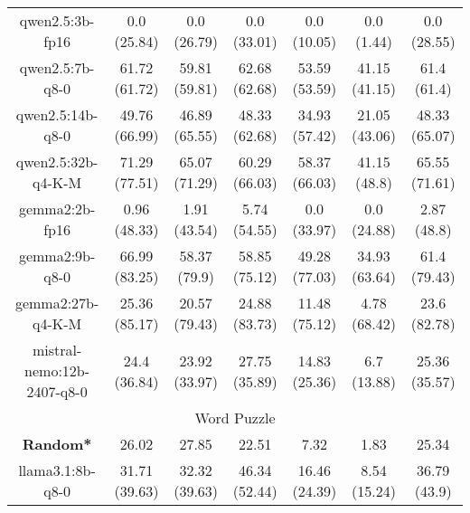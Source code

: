 \begin{table}[]
{\begin{tabular}{ccccccc}
        \multicolumn{1}{c|}{qwen2.5:3b-fp16} & 0.0 (25.84) & 0.0 (26.79) & \multicolumn{1}{c|}{0.0 (33.01)} & 0.0 (10.05) & \multicolumn{1}{c|}{0.0 (1.44)} & 0.0 (28.55) \\
        

        \multicolumn{1}{c|}{qwen2.5:7b-q8-0} & 61.72 (61.72) & 59.81 (59.81) & \multicolumn{1}{c|}{62.68 (62.68)} & 53.59 (53.59) & \multicolumn{1}{c|}{41.15 (41.15)} & 61.4 (61.4) \\
        

        \multicolumn{1}{c|}{qwen2.5:14b-q8-0} & 49.76 (66.99) & 46.89 (65.55) & \multicolumn{1}{c|}{48.33 (62.68)} & 34.93 (57.42) & \multicolumn{1}{c|}{21.05 (43.06)} & 48.33 (65.07) \\
        

        \multicolumn{1}{c|}{qwen2.5:32b-q4-K-M} & 71.29 (77.51) & 65.07 (71.29) & \multicolumn{1}{c|}{60.29 (66.03)} & 58.37 (66.03) & \multicolumn{1}{c|}{41.15 (48.8)} & 65.55 (71.61) \\
        

        \multicolumn{1}{c|}{gemma2:2b-fp16} & 0.96 (48.33) & 1.91 (43.54) & \multicolumn{1}{c|}{5.74 (54.55)} & 0.0 (33.97) & \multicolumn{1}{c|}{0.0 (24.88)} & 2.87 (48.8) \\
        

        \multicolumn{1}{c|}{gemma2:9b-q8-0} & 66.99 (83.25) & 58.37 (79.9) & \multicolumn{1}{c|}{58.85 (75.12)} & 49.28 (77.03) & \multicolumn{1}{c|}{34.93 (63.64)} & 61.4 (79.43) \\
        

        \multicolumn{1}{c|}{gemma2:27b-q4-K-M} & 25.36 (85.17) & 20.57 (79.43) & \multicolumn{1}{c|}{24.88 (83.73)} & 11.48 (75.12) & \multicolumn{1}{c|}{4.78 (68.42)} & 23.6 (82.78) \\
        

        \multicolumn{1}{c|}{mistral-nemo:12b-2407-q8-0} & 24.4 (36.84) & 23.92 (33.97) & \multicolumn{1}{c|}{27.75 (35.89)} & 14.83 (25.36) & \multicolumn{1}{c|}{6.7 (13.88)} & 25.36 (35.57) \\
        
\hline
\multicolumn{7}{c}{Word Puzzle} \\ \hline
\multicolumn{1}{c|}{\textbf{Random*}} & 26.02 & 27.85 & \multicolumn{1}{c|}{22.51} & 7.32 & \multicolumn{1}{c|}{1.83} & 25.34 \\ \hline

        \multicolumn{1}{c|}{llama3.1:8b-q8-0} & 31.71 (39.63) & 32.32 (39.63) & \multicolumn{1}{c|}{46.34 (52.44)} & 16.46 (24.39) & \multicolumn{1}{c|}{8.54 (15.24)} & 36.79 (43.9) \\
        


\end{tabular}}
\end{table}
